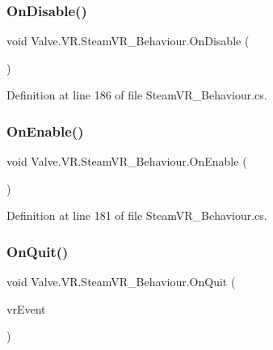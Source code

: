 \subsubsection{\texorpdfstring{OnDisable()}{OnDisable()}}
{\footnotesize\ttfamily void Valve.\+V\+R.\+Steam\+V\+R\+\_\+\+Behaviour.\+On\+Disable (\begin{DoxyParamCaption}{ }\end{DoxyParamCaption})\hspace{0.3cm}{\ttfamily [protected]}}



Definition at line 186 of file Steam\+V\+R\+\_\+\+Behaviour.\+cs.

\mbox{\label{class_valve_1_1_v_r_1_1_steam_v_r___behaviour_a3b5bca4e8fd04b4cee3c0c221ee91282}} 
\subsubsection{\texorpdfstring{OnEnable()}{OnEnable()}}
{\footnotesize\ttfamily void Valve.\+V\+R.\+Steam\+V\+R\+\_\+\+Behaviour.\+On\+Enable (\begin{DoxyParamCaption}{ }\end{DoxyParamCaption})\hspace{0.3cm}{\ttfamily [protected]}}



Definition at line 181 of file Steam\+V\+R\+\_\+\+Behaviour.\+cs.

\mbox{\label{class_valve_1_1_v_r_1_1_steam_v_r___behaviour_a2c20c71ddc268a656beb9850c282122a}} 
\subsubsection{\texorpdfstring{OnQuit()}{OnQuit()}}
{\footnotesize\ttfamily void Valve.\+V\+R.\+Steam\+V\+R\+\_\+\+Behaviour.\+On\+Quit (\begin{DoxyParamCaption}\item[{\mbox{\hyperlink{struct_valve_1_1_v_r_1_1_v_r_event__t}{V\+R\+Event\+\_\+t}}}]{vr\+Event }\end{DoxyParamCaption})\hspace{0.3cm}{\ttfamily [protected]}}



